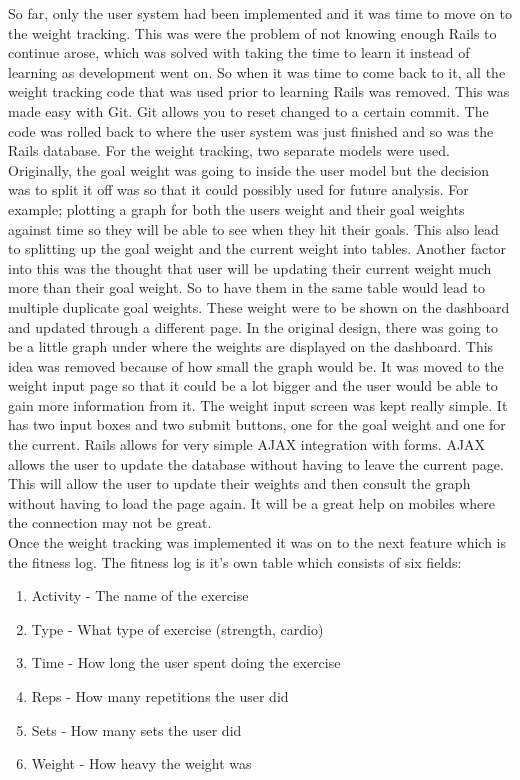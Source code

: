 So far, only the user system had been implemented and it was time to move on to the weight tracking. This was were the problem of not knowing enough Rails to continue arose, which was solved with taking the time to learn it instead of learning as development went on. So when it was time to come back to it, all the weight tracking code that was used prior to learning Rails was removed. This was made easy with Git. Git allows you to reset changed to a certain commit. The code was rolled back to where the user system was just finished and so was the Rails database. For the weight tracking, two separate models were used. Originally, the goal weight was going to inside the user model but the decision was to split it off was so that it could possibly used for future analysis. For example; plotting a graph for both the users weight and their goal weights against time so they will be able to see when they hit their goals. This also lead to splitting up the goal weight and the current weight into tables. Another factor into this was the thought that user will be updating their current weight much more than their goal weight. So to have them in the same table would lead to multiple duplicate goal weights. These weight were to be shown on the dashboard and updated through a different page. In the original design, there was going to be a little graph under where the weights are displayed on the dashboard. This idea was removed because of how small the graph would be. It was moved to the weight input page so that it could be a lot bigger and the user would be able to gain more information from it. The weight input screen was kept really simple. It has two input boxes and two submit buttons, one for the goal weight and one for the current. Rails allows for very simple AJAX integration with forms. AJAX allows the user to update the database without having to leave the current page. This will allow the user to update their weights and then consult the graph without having to load the page again. It will be a great help on mobiles where the connection may not be great.\\

Once the weight tracking was implemented it was on to the next feature which is the fitness log. The fitness log is it's own table which consists of six fields:

\begin{enumerate}
\item Activity - The name of the exercise
\item Type - What type of exercise (strength, cardio)
\item Time - How long the user spent doing the exercise
\item Reps - How many repetitions the user did
\item Sets - How many sets the user did
\item Weight - How heavy the weight was
\end{enumerate}

